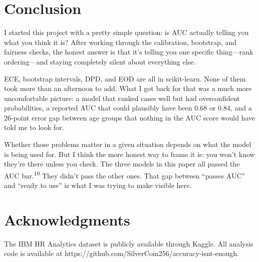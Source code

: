 \documentclass[12pt]{article}
\begin{document}
\section{Conclusion}

I started this project with a pretty simple question: is AUC actually
telling you what you think it is? After working through the calibration,
bootstrap, and fairness checks, the honest answer is that it's telling you
one specific thing---rank ordering---and staying completely silent about
everything else.

ECE, bootstrap intervals, DPD, and EOD are all in scikit-learn. None of
them took more than an afternoon to add. What I got back for that was a much
more uncomfortable picture: a model that ranked cases well but had
overconfident probabilities, a reported AUC that could plausibly have been
0.68 or 0.84, and a 26-point error gap between age groups that nothing in
the AUC score would have told me to look for.

Whether those problems matter in a given situation depends on what the model
is being used for. But I think the more honest way to frame it is: you won't
know they're there unless you check. The three models in this paper all
passed the AUC bar.\textsuperscript{10} They didn't pass the other ones.
That gap between ``passes AUC'' and ``ready to use'' is what I was trying
to make visible here.

\section*{Acknowledgments}

The IBM HR Analytics dataset is publicly available through Kaggle. All
analysis code is available at https://github.com/SilverCoin256/accuracy-isnt-enough.
\end{document}
